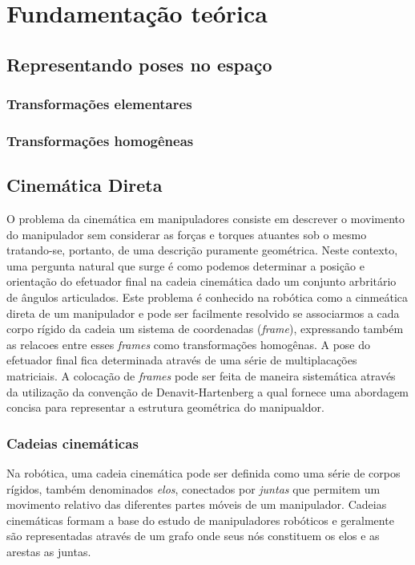 \chapter{Fundamentação teórica}\label{cap:background}

\section{Representando poses no espaço}

\subsection{Transformações elementares}

\subsection{Transformações homogêneas}

\section{Cinemática Direta}

O problema da cinemática em manipuladores consiste em descrever o movimento do
manipulador sem considerar as forças e torques atuantes sob o mesmo
tratando-se, portanto, de uma descrição puramente geométrica. Neste contexto,
uma pergunta natural que surge é como podemos determinar a posição e orientação
do efetuador final na cadeia cinemática dado um conjunto arbritário de ângulos
articulados. Este problema é conhecido na robótica como a cinmeática direta de
um manipulador e pode ser facilmente resolvido se associarmos a cada corpo
rígido da cadeia um sistema de coordenadas (\emph{frame}), expressando também
as relacoes entre esses \emph{frames} como transformações homogênas. A pose do
efetuador final fica determinada através de uma série de multiplacações
matriciais. A colocação de \emph{frames} pode ser feita de maneira sistemática
através da utilização da convenção de Denavit-Hartenberg a qual fornece uma
abordagem concisa para representar a estrutura geométrica do manipualdor.

\subsection{Cadeias cinemáticas}

Na robótica, uma cadeia cinemática pode ser definida como uma série de corpos
rígidos, também denominados \emph{elos}, conectados por \emph{juntas} que
permitem um movimento relativo das diferentes partes móveis de um manipulador.
Cadeias cinemáticas formam a base do estudo de manipuladores robóticos e
geralmente são representadas através de um grafo onde seus nós constituem os
elos e as arestas as juntas.

